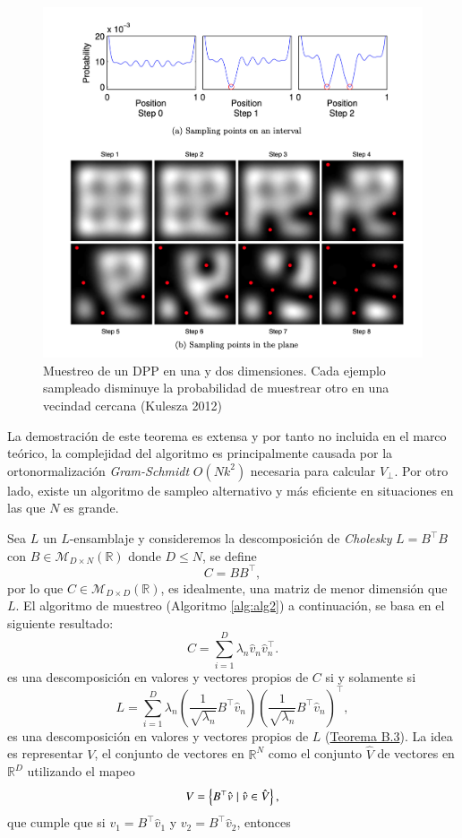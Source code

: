 \begin{figure}[ht]
    \centering
    \includegraphics[width=12cm]{img/tesis/DPP_sampling.png}
    \caption{Muestreo de un DPP en una y dos dimensiones. Cada ejemplo sampleado disminuye la probabilidad de muestrear otro en una vecindad cercana (Kulesza 2012)}
    \label{fig:example}
\end{figure}

La demostración de este teorema es extensa y por tanto no incluida en el marco teórico, la complejidad del algoritmo es principalmente causada por la ortonormalización \textit{Gram-Schmidt} $O(Nk^2)$ necesaria para calcular $V_{\perp}$. Por otro lado, existe un algoritmo de sampleo alternativo y más eficiente en situaciones en las que $N$ es grande. 

\vspace{0.2cm}

Sea $L$ un $L$-ensamblaje y consideremos la descomposición de \textit{Cholesky} $L = B^{\top}B$ con $B \in \mathcal{M}_{D \times N}(\mathbb{R})$ donde $D \leq N$, se define 
\[
C = BB^{\top}, 
\]
por lo que $C \in \mathcal{M}_{D \times D}(\mathbb{R})$, es idealmente, una matriz de menor dimensión que $L$. El algoritmo de muestreo (Algoritmo \ref{alg:alg2}) a continuación, se basa en el siguiente resultado: 
\[ 
C = \sum_{i=1}^D \lambda_n\hat{v}_n\hat{v}^{\top}_n.
\]
es una descomposición en valores y vectores propios de $C$ si y solamente si 
\[
L = \sum_{i=1}^D \lambda_n \left ( \frac{1}{\sqrt{\lambda_n}}B^{\top}\hat{v}_n\right ) \left ( \frac{1}{\sqrt{\lambda_n}}B^{\top}\hat{v}_n\right )^{\top},
\]
es una descomposición en valores y vectores propios de $L$ (\hyperlink{Teorema B.3}{Teorema B.3}). La idea es representar $V$, el conjunto de vectores en $\mathbb{R}^N$ como el conjunto $\hat{V}$ de vectores en $\mathbb{R}^D$ utilizando el mapeo
\[
V = \left \{ B^{\top}\hat{v} \hspace{0.1cm} | \hspace{0.1cm} \hat{v} \in \hat{V} \right \},
\]
que cumple que si $v_1 = B^{\top}\hat{v}_1$ y $v_2 = B^{\top}\hat{v}_2$, entonces 

